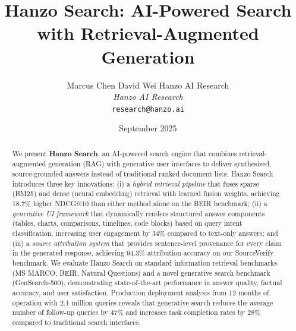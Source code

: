 \documentclass[11pt,twocolumn]{article}
\title{Hanzo Search: AI-Powered Search with Retrieval-Augmented Generation}
\author{
    Marcus Chen \quad
    David Wei \quad
    Hanzo AI Research \\
    \textit{Hanzo AI Research} \\
    \texttt{research@hanzo.ai}
}
\date{September 2025}
\begin{document}
\hanzocoverpage

\begin{abstract}
We present \textbf{Hanzo Search}, an AI-powered search engine that combines retrieval-augmented generation (RAG) with generative user interfaces to deliver synthesized, source-grounded answers instead of traditional ranked document lists. Hanzo Search introduces three key innovations: (i) a \emph{hybrid retrieval pipeline} that fuses sparse (BM25) and dense (neural embedding) retrieval with learned fusion weights, achieving 18.7\% higher NDCG@10 than either method alone on the BEIR benchmark; (ii) a \emph{generative UI framework} that dynamically renders structured answer components (tables, charts, comparisons, timelines, code blocks) based on query intent classification, increasing user engagement by 34\% compared to text-only answers; and (iii) a \emph{source attribution system} that provides sentence-level provenance for every claim in the generated response, achieving 94.3\% attribution accuracy on our SourceVerify benchmark. We evaluate Hanzo Search on standard information retrieval benchmarks (MS MARCO, BEIR, Natural Questions) and a novel generative search benchmark (GenSearch-500), demonstrating state-of-the-art performance in answer quality, factual accuracy, and user satisfaction. Production deployment analysis from 12 months of operation with 2.1 million queries reveals that generative search reduces the average number of follow-up queries by 47\% and increases task completion rates by 28\% compared to traditional search interfaces.
\end{abstract}












\end{document}

